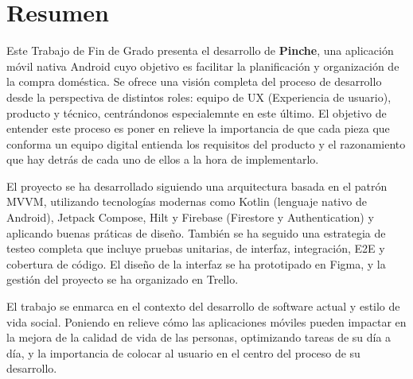 \chapter*{Resumen}

Este Trabajo de Fin de Grado presenta el desarrollo de \textbf{Pinche}, una aplicación móvil nativa Android cuyo objetivo es facilitar la planificación y organización de la compra doméstica. Se ofrece una visión completa del proceso de desarrollo desde la perspectiva de distintos roles: equipo de UX (Experiencia de usuario), producto y técnico, centrándonos especialemnte en este último. El objetivo de entender este proceso es poner en relieve la importancia de que cada pieza que conforma un equipo digital entienda los requisitos del producto y el razonamiento que hay detrás de cada uno de ellos a la hora de implementarlo.

El proyecto se ha desarrollado siguiendo una arquitectura basada en el patrón MVVM, utilizando tecnologías modernas como Kotlin (lenguaje nativo de Android), Jetpack Compose, Hilt y Firebase (Firestore y Authentication) y aplicando buenas práticas de diseño. También se ha seguido una estrategia de testeo completa que incluye pruebas unitarias, de interfaz, integración, E2E y cobertura de código. El diseño de la interfaz se ha prototipado en Figma, y la gestión del proyecto se ha organizado en Trello.

El trabajo se enmarca en el contexto del desarrollo de software actual y estilo de vida social. Poniendo en relieve cómo las aplicaciones móviles pueden impactar en la mejora de la calidad de vida de las personas, optimizando tareas de su día a día, y la importancia de colocar al usuario en el centro del proceso de su desarrollo.

